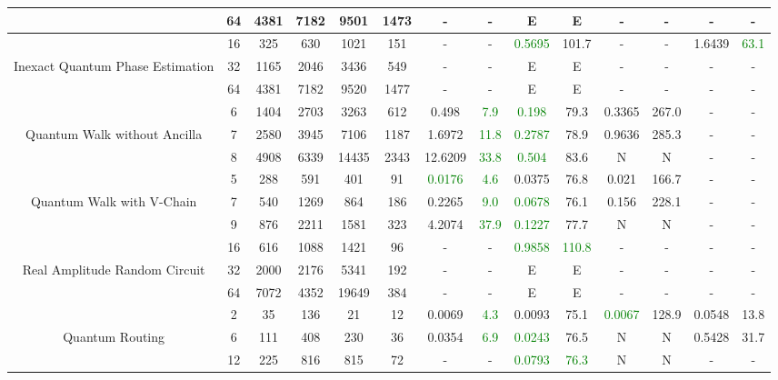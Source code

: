 \begin{table}[htb]
{\begin{tabular}{|c|c|c|c|c|c|c|c|c|c|c|c|c|c|}
 \\
 & 
64 & 4381 & 7182 & 9501 & 1473
 & - & -
 & E & E
 & - & -
 & - & -
 \\
\hline
 & 
16 & 325 & 630 & 1021 & 151
 & - & -
 & \textcolor{green}{0.5695} & 101.7
 & - & -
 & 1.6439 & \textcolor{green}{63.1}
 \\
Inexact Quantum Phase Estimation & 
32 & 1165 & 2046 & 3436 & 549
 & - & -
 & E & E
 & - & -
 & - & -
 \\
 & 
64 & 4381 & 7182 & 9520 & 1477
 & - & -
 & E & E
 & - & -
 & - & -
 \\
\hline
 & 
6 & 1404 & 2703 & 3263 & 612
 & 0.498 & \textcolor{green}{7.9}
 & \textcolor{green}{0.198} & 79.3
 & 0.3365 & 267.0
 & - & -
 \\
Quantum Walk without Ancilla & 
7 & 2580 & 3945 & 7106 & 1187
 & 1.6972 & \textcolor{green}{11.8}
 & \textcolor{green}{0.2787} & 78.9
 & 0.9636 & 285.3
 & - & -
 \\
 & 
8 & 4908 & 6339 & 14435 & 2343
 & 12.6209 & \textcolor{green}{33.8}
 & \textcolor{green}{0.504} & 83.6
 & N & N 
 & - & -
 \\
\hline
 & 
5 & 288 & 591 & 401 & 91
 & \textcolor{green}{0.0176} & \textcolor{green}{4.6}
 & 0.0375 & 76.8
 & 0.021 & 166.7
 & - & -
 \\
Quantum Walk with V-Chain & 
7 & 540 & 1269 & 864 & 186
 & 0.2265 & \textcolor{green}{9.0}
 & \textcolor{green}{0.0678} & 76.1
 & 0.156 & 228.1
 & - & -
 \\
 & 
9 & 876 & 2211 & 1581 & 323
 & 4.2074 & \textcolor{green}{37.9}
 & \textcolor{green}{0.1227} & 77.7
 & N & N 
 & - & -
 \\
\hline
 & 
16 & 616 & 1088 & 1421 & 96
 & - & -
 & \textcolor{green}{0.9858} & \textcolor{green}{110.8}
 & - & -
 & - & -
 \\
Real Amplitude Random Circuit & 
32 & 2000 & 2176 & 5341 & 192
 & - & -
 & E & E
 & - & -
 & - & -
 \\
 & 
64 & 7072 & 4352 & 19649 & 384
 & - & -
 & E & E
 & - & -
 & - & -
 \\
\hline
 & 
2 & 35 & 136 & 21 & 12
 & 0.0069 & \textcolor{green}{4.3}
 & 0.0093 & 75.1
 & \textcolor{green}{0.0067} & 128.9
 & 0.0548 & 13.8
 \\
Quantum Routing & 
6 & 111 & 408 & 230 & 36
 & 0.0354 & \textcolor{green}{6.9}
 & \textcolor{green}{0.0243} & 76.5
 & N & N 
 & 0.5428 & 31.7
 \\
 & 
12 & 225 & 816 & 815 & 72
 & - & -
 & \textcolor{green}{0.0793} & \textcolor{green}{76.3}
 & N & N 
 & - & -
 \\

\end{tabular}}
\end{table}
